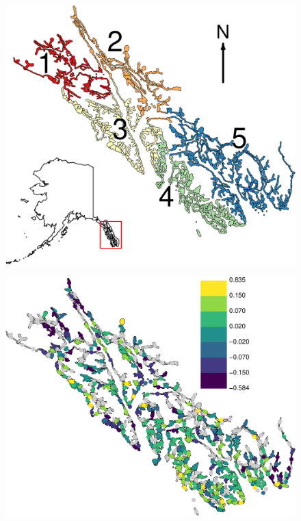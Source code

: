 \documentclass[11pt, titlepage]{article}\usepackage[]{graphicx}\usepackage[]{color}
\begin{document}
\begin{spacing}{1.9}
\begin{flushleft}
\begin{figure}[H]
  \begin{center}
  \includegraphics[width=\linewidth]{Fig-Stocks.pdf}
  \end{center}
  \caption{  \label{Fig-Stocks}}         
\end{figure}




\begin{figure}[H]
  \begin{center}
  \includegraphics[width=\linewidth]{Fig-MapRaw.pdf}
  \end{center}
  \caption{ \label{Fig-MapRaw}}     
\end{figure}



\end{flushleft}
\end{spacing}
\end{document}
